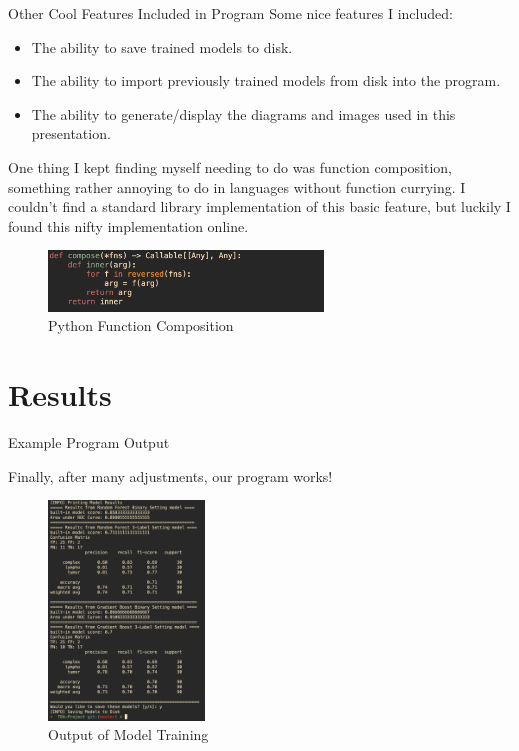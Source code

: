 \documentclass[11pt]{beamer}
\begin{document}
\begin{frame}{Other Cool Features Included in Program}
    Some nice features I included:
    \begin{itemize}
        \item The ability to save trained models to disk.
        \item The ability to import previously trained models from disk into the program.
        \item The ability to generate/display the diagrams and images used in this presentation.
    \end{itemize}

    \vspace{3mm}

    \par One thing I kept finding myself needing to do was function composition, something rather annoying to do in languages without function currying. I couldn't find a standard library implementation of this basic feature, but luckily I found this nifty implementation online.

    \begin{figure}
        \caption{Python Function Composition}
        \centering
        \includegraphics[width=0.65\textwidth]{imagens/function_composition.png}

    \end{figure}
    
\end{frame}

\section{Results}

\begin{frame}{Example Program Output}
    \par \centering Finally, after many adjustments, our program works!
    \begin{figure}
        \caption{Output of Model Training}
        \centering
        \includegraphics[width=0.37\textwidth]{imagens/small_program_output.png}

    \end{figure}
\end{frame}
\end{document}
